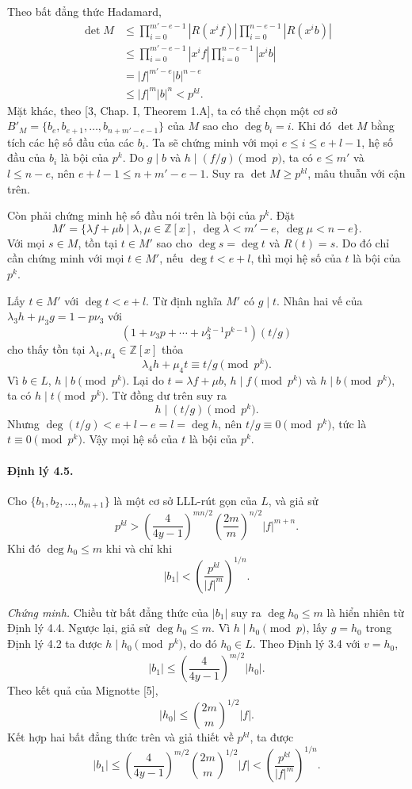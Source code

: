 \documentclass[11pt]{article}
\begin{document}
Theo bất đẳng thức Hadamard,
\[
\begin{aligned}
  \det M
  &\le \prod_{i=0}^{m'-e-1}|R(x^if)|\prod_{i=0}^{n-e-1}|R(x^ib)|\\
  &\le \prod_{i=0}^{m'-e-1}|x^if|\prod_{i=0}^{n-e-1}|x^ib|\\
  &=|f|^{m'-e}|b|^{n-e}\\
  &\le |f|^m|b|^n
  <p^{kl}.
\end{aligned}
\]
Mặt khác, theo [3, Chap. I, Theorem 1.A], ta có thể chọn một
cơ sở \(B'_M=\{b_e,b_{e+1},\ldots,b_{n+m'-e-1}\}\) của \(M\) sao cho
\(\deg b_i=i\). Khi đó \(\det M\) bằng tích các hệ số đầu của các \(b_i\).
Ta sẽ chứng minh với mọi \(e\le i\le e+l-1\), hệ số đầu của \(b_i\) là bội của
\(p^k\). Do \(g\mid b\) và \(h\mid (f/g)\pmod p\), ta có \(e\le m'\) và
\(l\le n-e\), nên \(e+l-1\le n+m'-e-1\). Suy ra \(\det M\ge p^{kl}\), mâu
thuẫn với cận trên.

Còn phải chứng minh hệ số đầu nói trên là bội của \(p^k\). Đặt
\[
  M'=\{\lambda f+\mu b\mid
      \lambda,\mu\in\mathbb Z[x],\ \deg\lambda<m'-e,\ \deg\mu<n-e\}.
\]
Với mọi \(s\in M\), tồn tại \(t\in M'\) sao cho \(\deg s=\deg t\) và
\(R(t)=s\). Do đó chỉ cần chứng minh với mọi \(t\in M'\), nếu
\(\deg t<e+l\), thì mọi hệ số của \(t\) là bội của \(p^k\).

Lấy \(t\in M'\) với \(\deg t<e+l\). Từ định nghĩa \(M'\) có \(g\mid t\). Nhân
hai vế của
\(\lambda_3h+\mu_3g=1-p\nu_3\) với
\[
  (1+\nu_3p+\cdots+\nu_3^{k-1}p^{k-1})(t/g)
\]
cho thấy tồn tại \(\lambda_4,\mu_4\in\mathbb Z[x]\) thỏa
\[
  \lambda_4h+\mu_4t\equiv t/g\pmod {p^k}.
\]
Vì \(b\in L\), \(h\mid b\pmod {p^k}\). Lại do
\(t=\lambda f+\mu b\), \(h\mid f\pmod {p^k}\) và \(h\mid b\pmod {p^k}\), ta có
\(h\mid t\pmod {p^k}\). Từ đồng dư trên suy ra
\[
  h\mid (t/g)\pmod {p^k}.
\]
Nhưng \(\deg(t/g)<e+l-e=l=\deg h\), nên \(t/g\equiv0\pmod {p^k}\), tức là
\(t\equiv0\pmod {p^k}\). Vậy mọi hệ số của \(t\) là bội của \(p^k\).

\paragraph{Định lý 4.5.}
Cho \(\{b_1,b_2,\ldots,b_{m+1}\}\) là một cơ sở LLL-rút gọn của \(L\), và giả
sử
\[
  p^{kl}>
  \left(\frac{4}{4y-1}\right)^{mn/2}
  \left(\frac{2m}{m}\right)^{n/2}
  |f|^{m+n}.
\]
Khi đó \(\deg h_0\le m\) khi và chỉ khi
\[
  |b_1|<\left(\frac{p^{kl}}{|f|^m}\right)^{1/n}.
\]

\emph{Chứng minh.}
Chiều từ bất đẳng thức của \(|b_1|\) suy ra \(\deg h_0\le m\) là hiển nhiên
từ Định lý 4.4. Ngược lại, giả sử \(\deg h_0\le m\). Vì \(h\mid h_0\pmod p\),
lấy \(g=h_0\) trong Định lý 4.2 ta được \(h\mid h_0\pmod {p^k}\), do đó
\(h_0\in L\). Theo Định lý 3.4 với \(v=h_0\),
\[
  |b_1|\le \left(\frac{4}{4y-1}\right)^{m/2}|h_0|.
\]
Theo kết quả của Mignotte [5],
\[
  |h_0|\le \binom{2m}{m}^{1/2}|f|.
\]
Kết hợp hai bất đẳng thức trên và giả thiết về \(p^{kl}\), ta được
\[
  |b_1|
  \le \left(\frac{4}{4y-1}\right)^{m/2}
      \binom{2m}{m}^{1/2}|f|
  <\left(\frac{p^{kl}}{|f|^m}\right)^{1/n}.
\]
\end{document}
